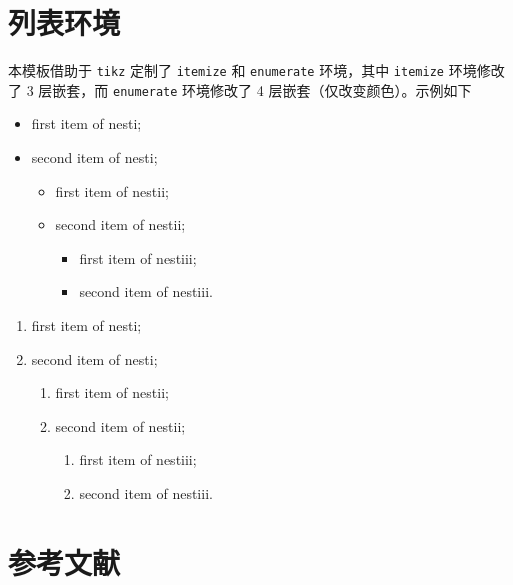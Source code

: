 \documentclass[lang=cn,newtx,10pt,scheme=chinese]{elegantbook}
\begin{document}
\section{列表环境}
本模板借助于 \lstinline{tikz} 定制了 \lstinline{itemize} 和 \lstinline{enumerate} 环境，其中 \lstinline{itemize} 环境修改了 3 层嵌套，而 \lstinline{enumerate} 环境修改了 4 层嵌套（仅改变颜色）。示例如下\\[2ex]
\begin{minipage}[b]{0.49\textwidth}
  \begin{itemize}
    \item first item of nesti;
    \item second item of nesti;
      \begin{itemize}
        \item first item of nestii;
        \item second item of nestii;
        \begin{itemize}
          \item first item of nestiii;
          \item second item of nestiii.
        \end{itemize}   
      \end{itemize}
  \end{itemize}
\end{minipage}
\begin{minipage}[b]{0.49\textwidth}
  \begin{enumerate}
    \item first item of nesti;
    \item second item of nesti;
      \begin{enumerate}
        \item first item of nestii;
        \item second item of nestii;
        \begin{enumerate}
          \item first item of nestiii;
          \item second item of nestiii.
        \end{enumerate}   
      \end{enumerate}
  \end{enumerate}
\end{minipage}

\section{参考文献}
\end{document}
